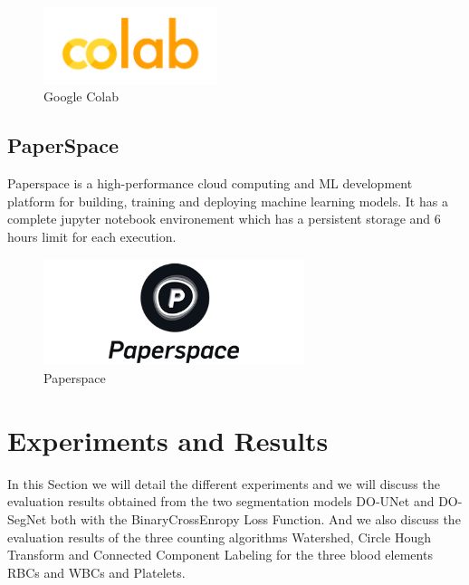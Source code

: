 \begin{figure}[H]
\centering
  \vspace{-0.1in}
    \centerline{\includegraphics[width = 2in]{../images/colab.png}}
    \caption{Google Colab}
    \label{Google Colab}
\end{figure}

\subsection{PaperSpace}
Paperspace is a high-performance cloud computing and ML development platform for building, training and deploying machine learning models. It has a complete jupyter notebook environement which has a persistent storage and 6 hours limit for each execution.

\begin{figure}[H]
    \centering
      \vspace{-0.1in}
        \centerline{\includegraphics[width = 3in]{../images/paperspace.png}}
        \caption{Paperspace}
        \label{Paperspace}
    \end{figure}

\section{Experiments and Results}
In this Section we will detail the different experiments and we will discuss the evaluation results obtained from the two segmentation models DO-UNet and DO-SegNet both with the BinaryCrossEnropy Loss Function. And we also discuss the evaluation results of the three counting algorithms Watershed, Circle Hough Transform and Connected Component Labeling for the three blood elements RBCs and WBCs and Platelets.

